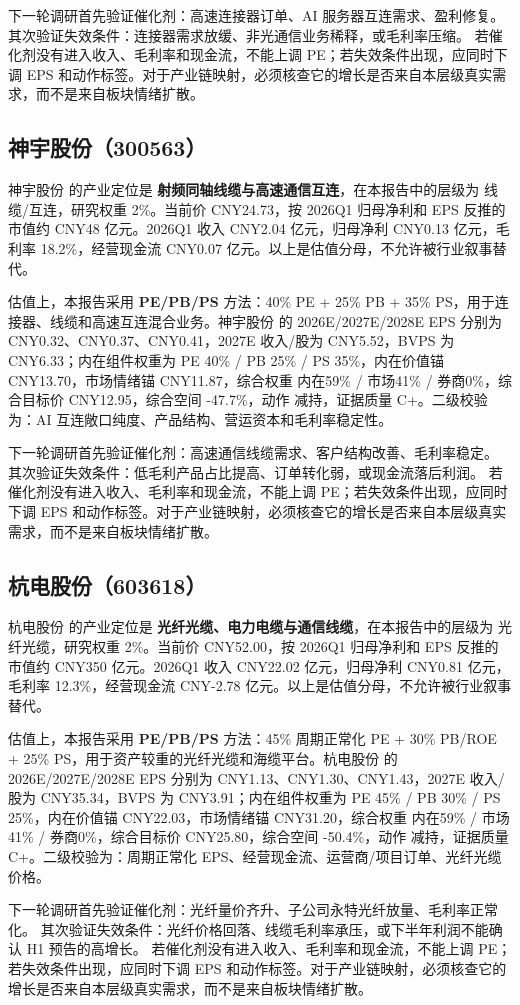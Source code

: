 下一轮调研首先验证催化剂：高速连接器订单、AI 服务器互连需求、盈利修复。 其次验证失效条件：连接器需求放缓、非光通信业务稀释，或毛利率压缩。 若催化剂没有进入收入、毛利率和现金流，不能上调 PE；若失效条件出现，应同时下调 EPS 和动作标签。对于产业链映射，必须核查它的增长是否来自本层级真实需求，而不是来自板块情绪扩散。


\subsection{神宇股份（300563）}
神宇股份 的产业定位是 \textbf{射频同轴线缆与高速通信互连}，在本报告中的层级为 线缆/互连，研究权重 2\%。当前价 CNY24.73，按 2026Q1 归母净利和 EPS 反推的市值约 CNY48 亿元。2026Q1 收入 CNY2.04 亿元，归母净利 CNY0.13 亿元，毛利率 18.2\%，经营现金流 CNY0.07 亿元。以上是估值分母，不允许被行业叙事替代。

估值上，本报告采用 \textbf{PE/PB/PS} 方法：40\% PE + 25\% PB + 35\% PS，用于连接器、线缆和高速互连混合业务。神宇股份 的 2026E/2027E/2028E EPS 分别为 CNY0.32、CNY0.37、CNY0.41，2027E 收入/股为 CNY5.52，BVPS 为 CNY6.33；内在组件权重为 PE 40\% / PB 25\% / PS 35\%，内在价值锚 CNY13.70，市场情绪锚 CNY11.87，综合权重 内在59\% / 市场41\% / 券商0\%，综合目标价 CNY12.95，综合空间 -47.7\%，动作 减持，证据质量 C+。二级校验为：AI 互连敞口纯度、产品结构、营运资本和毛利率稳定性。

下一轮调研首先验证催化剂：高速通信线缆需求、客户结构改善、毛利率稳定。 其次验证失效条件：低毛利产品占比提高、订单转化弱，或现金流落后利润。 若催化剂没有进入收入、毛利率和现金流，不能上调 PE；若失效条件出现，应同时下调 EPS 和动作标签。对于产业链映射，必须核查它的增长是否来自本层级真实需求，而不是来自板块情绪扩散。


\subsection{杭电股份（603618）}
杭电股份 的产业定位是 \textbf{光纤光缆、电力电缆与通信线缆}，在本报告中的层级为 光纤光缆，研究权重 2\%。当前价 CNY52.00，按 2026Q1 归母净利和 EPS 反推的市值约 CNY350 亿元。2026Q1 收入 CNY22.02 亿元，归母净利 CNY0.81 亿元，毛利率 12.3\%，经营现金流 CNY-2.78 亿元。以上是估值分母，不允许被行业叙事替代。

估值上，本报告采用 \textbf{PE/PB/PS} 方法：45\% 周期正常化 PE + 30\% PB/ROE + 25\% PS，用于资产较重的光纤光缆和海缆平台。杭电股份 的 2026E/2027E/2028E EPS 分别为 CNY1.13、CNY1.30、CNY1.43，2027E 收入/股为 CNY35.34，BVPS 为 CNY3.91；内在组件权重为 PE 45\% / PB 30\% / PS 25\%，内在价值锚 CNY22.03，市场情绪锚 CNY31.20，综合权重 内在59\% / 市场41\% / 券商0\%，综合目标价 CNY25.80，综合空间 -50.4\%，动作 减持，证据质量 C+。二级校验为：周期正常化 EPS、经营现金流、运营商/项目订单、光纤光缆价格。

下一轮调研首先验证催化剂：光纤量价齐升、子公司永特光纤放量、毛利率正常化。 其次验证失效条件：光纤价格回落、线缆毛利率承压，或下半年利润不能确认 H1 预告的高增长。 若催化剂没有进入收入、毛利率和现金流，不能上调 PE；若失效条件出现，应同时下调 EPS 和动作标签。对于产业链映射，必须核查它的增长是否来自本层级真实需求，而不是来自板块情绪扩散。
